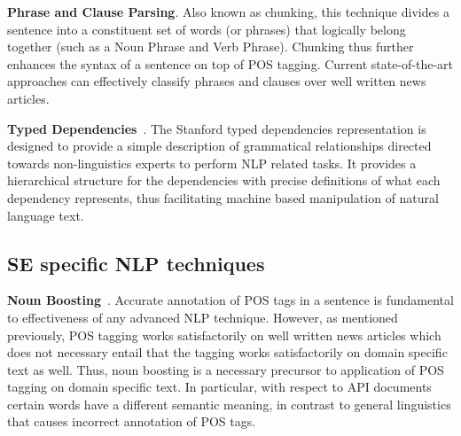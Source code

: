 \textbf{Phrase and Clause Parsing}. Also known as chunking, this technique divides a sentence into a constituent set of words (or phrases) that logically belong together (such as a Noun Phrase and Verb Phrase). Chunking thus further enhances the syntax of a sentence on top of POS tagging. Current state-of-the-art approaches can effectively classify phrases and clauses over well written news articles.

\textbf{Typed Dependencies}~\cite{Marneffe06LREC,Marneffe08COLING}. The Stanford typed dependencies representation  is designed to provide a simple description of grammatical relationships directed towards non-linguistics experts to perform NLP related tasks. It provides a hierarchical structure for the dependencies with precise definitions of what each dependency represents, thus facilitating machine based manipulation of natural language text.




\subsection{SE specific NLP techniques}
\label{sub:SENLPback}

\textbf{Noun Boosting}~\cite{pandita12:inferring}. Accurate annotation of POS tags in a sentence is fundamental to effectiveness of any advanced NLP technique.
However, as mentioned previously, POS tagging works satisfactorily on well written news articles which does not necessary entail that the tagging works satisfactorily on domain specific text as well.
Thus, noun boosting is a necessary precursor to application of POS tagging on domain specific text.
In particular, with respect to API documents certain words have a different semantic meaning, in contrast to general linguistics that causes incorrect annotation of POS tags.

